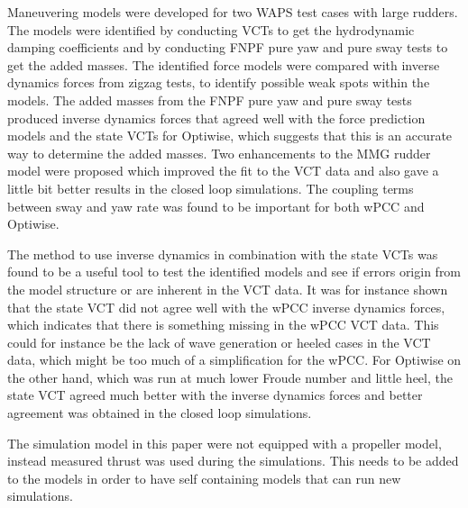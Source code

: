 %
\noindent Maneuvering models were developed for two WAPS test cases with large rudders. The models were identified by conducting VCTs to get the hydrodynamic damping coefficients and by conducting FNPF pure yaw and pure sway tests to get the added masses. The identified force models were compared with inverse dynamics forces from zigzag tests, to identify possible weak spots within the models.  
The added masses from the FNPF pure yaw and pure sway tests produced inverse dynamics forces that agreed well with the force prediction models and the state VCTs for Optiwise, which suggests that this is an accurate way to determine the added masses.
Two enhancements to the MMG rudder model were proposed which improved the fit to the VCT data and also gave a little bit better results in the closed loop simulations.
The coupling terms between sway and yaw rate was found to be important for both wPCC and Optiwise.

The method to use inverse dynamics in combination with the state VCTs was found to be a useful tool to test the identified models and see if errors origin from the model structure or are inherent in the VCT data.
It was for instance shown that the state VCT did not agree well with the wPCC inverse dynamics forces, which indicates that there is something missing in the wPCC VCT data. This could for instance be the lack of wave generation or heeled cases in the VCT data, which might be too much of a simplification for the wPCC.
For Optiwise on the other hand, which was run at much lower Froude number and little heel, the state VCT agreed much better with the inverse dynamics forces and better agreement was obtained in the closed loop simulations.

The simulation model in this paper were not equipped with a propeller model, instead measured thrust was used during the simulations. This needs to be added to the models in order to have self containing models that can run new simulations. 
